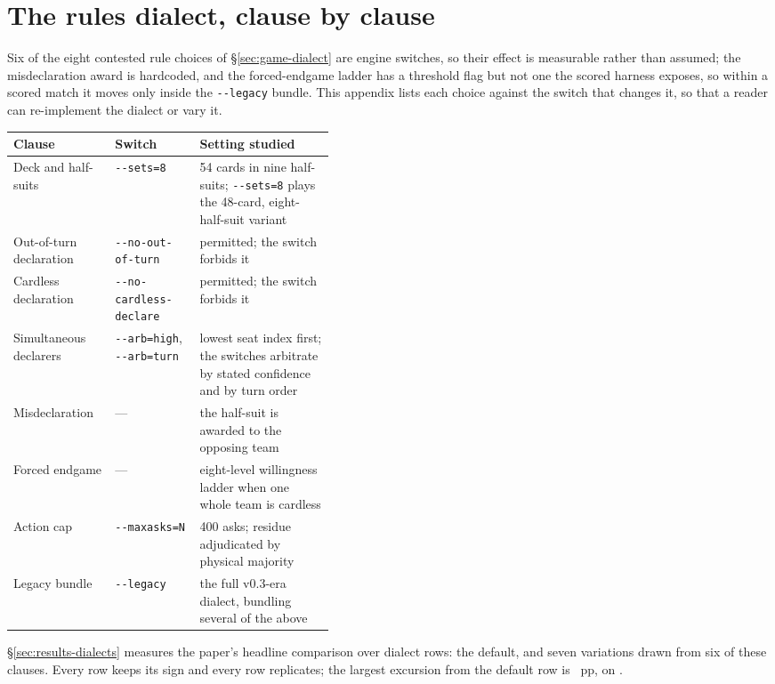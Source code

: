\section{The rules dialect, clause by clause}
\label{app:dialect}

Six of the eight contested rule choices of \S\ref{sec:game-dialect} are engine switches, so their
effect is measurable rather than assumed; the misdeclaration award is hardcoded, and the
forced-endgame ladder has a threshold flag but not one the scored harness exposes, so within a
scored match it moves only inside the \texttt{-{}-legacy} bundle. This appendix lists each choice
against the switch that changes it, so that a reader can re-implement the dialect or vary it.

\begin{center}\tabfont
\begin{tabular}{llp{0.42\linewidth}}
\toprule
Clause & Switch & Setting studied \\
\midrule
Deck and half-suits & \texttt{-{}-sets=8} & 54 cards in nine half-suits; \texttt{-{}-sets=8} plays the
48-card, eight-half-suit variant \\
Out-of-turn declaration & \texttt{-{}-no-out-of-turn} & permitted; the switch forbids it \\
Cardless declaration & \texttt{-{}-no-cardless-declare} & permitted; the switch forbids it \\
Simultaneous declarers & \texttt{-{}-arb=high}, \texttt{-{}-arb=turn} & lowest seat index first;
the switches arbitrate by stated confidence and by turn order \\
Misdeclaration & --- & the half-suit is awarded to the opposing team \\
Forced endgame & --- & eight-level willingness ladder when one whole team is cardless \\
Action cap & \texttt{-{}-maxasks=N} & 400 asks; residue adjudicated by physical majority \\
Legacy bundle & \texttt{-{}-legacy} & the full v0.3-era dialect, bundling several of the above \\
\bottomrule
\end{tabular}
\end{center}

\S\ref{sec:results-dialects} measures the paper's headline comparison over \vsevenDiaRows{}
dialect rows: the default, and seven variations drawn from six of these clauses. Every row keeps its sign and every row replicates; the largest excursion from the
default row is \vsevenDiaMaxExcursion{}~pp, on \vsevenDiaMaxExcursionRow{}.

